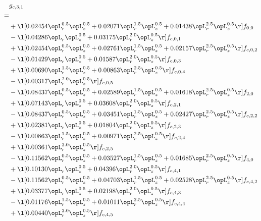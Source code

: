 \begin{alignat}{2} 
\label{eq:g_31_0} 
& g_{c,3,1} \nonumber \\ 
 = \\ 
& + \l[  0.02454 \opL_r^{0.5} \opL_z^{0.5} +  0.02071 \opL_r^{1.5} \opL_z^{0.5} +  0.01438 \opL_r^{2.5} \opL_z^{0.5}  \r] f_{0,0} \nonumber \\ 
& - \l[  0.04286 \opL_r \opL_z^{0.5} +  0.03175 \opL_r^{2.0} \opL_z^{0.5}  \r] f_{c,0,1} \nonumber \\ 
& + \l[  0.02454 \opL_r^{0.5} \opL_z^{0.5} +  0.02761 \opL_r^{1.5} \opL_z^{0.5} +  0.02157 \opL_r^{2.5} \opL_z^{0.5}  \r] f_{c,0,2} \nonumber \\ 
& - \l[  0.01429 \opL_r \opL_z^{0.5} +  0.01587 \opL_r^{2.0} \opL_z^{0.5}  \r] f_{c,0,3} \nonumber \\ 
& + \l[  0.00690 \opL_r^{1.5} \opL_z^{0.5} +  0.00863 \opL_r^{2.5} \opL_z^{0.5}  \r] f_{c,0,4} \nonumber \\ 
& - \l[  0.00317 \opL_r^{2.0} \opL_z^{0.5}  \r] f_{c,0,5} \nonumber \\ 
& - \l[  0.08437 \opL_r^{0.5} \opL_z^{0.5} +  0.02589 \opL_r^{1.5} \opL_z^{0.5} +  0.01618 \opL_r^{2.5} \opL_z^{0.5}  \r] f_{2,0} \nonumber \\ 
& + \l[  0.07143 \opL_r \opL_z^{0.5} +  0.03608 \opL_r^{2.0} \opL_z^{0.5}  \r] f_{c,2,1} \nonumber \\ 
& - \l[  0.08437 \opL_r^{0.5} \opL_z^{0.5} +  0.03451 \opL_r^{1.5} \opL_z^{0.5} +  0.02427 \opL_r^{2.5} \opL_z^{0.5}  \r] f_{c,2,2} \nonumber \\ 
& + \l[  0.02381 \opL_r \opL_z^{0.5} +  0.01804 \opL_r^{2.0} \opL_z^{0.5}  \r] f_{c,2,3} \nonumber \\ 
& - \l[  0.00863 \opL_r^{1.5} \opL_z^{0.5} +  0.00971 \opL_r^{2.5} \opL_z^{0.5}  \r] f_{c,2,4} \nonumber \\ 
& + \l[  0.00361 \opL_r^{2.0} \opL_z^{0.5}  \r] f_{c,2,5} \nonumber \\ 
& - \l[  0.11562 \opL_r^{0.5} \opL_z^{0.5} +  0.03527 \opL_r^{1.5} \opL_z^{0.5} +  0.01685 \opL_r^{2.5} \opL_z^{0.5}  \r] f_{4,0} \nonumber \\ 
& + \l[  0.10130 \opL_r \opL_z^{0.5} +  0.04396 \opL_r^{2.0} \opL_z^{0.5}  \r] f_{c,4,1} \nonumber \\ 
& - \l[  0.11562 \opL_r^{0.5} \opL_z^{0.5} +  0.04703 \opL_r^{1.5} \opL_z^{0.5} +  0.02528 \opL_r^{2.5} \opL_z^{0.5}  \r] f_{c,4,2} \nonumber \\ 
& + \l[  0.03377 \opL_r \opL_z^{0.5} +  0.02198 \opL_r^{2.0} \opL_z^{0.5}  \r] f_{c,4,3} \nonumber \\ 
& - \l[  0.01176 \opL_r^{1.5} \opL_z^{0.5} +  0.01011 \opL_r^{2.5} \opL_z^{0.5}  \r] f_{c,4,4} \nonumber \\ 
& + \l[  0.00440 \opL_r^{2.0} \opL_z^{0.5}  \r] f_{c,4,5} \nonumber \\ 
\end{alignat} 



